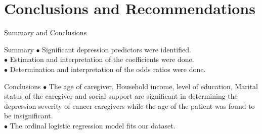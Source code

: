 \documentclass{beamer}
\numberwithin{equation}{section}
\numberwithin{table}{section}
\begin{document}
\section{Conclusions and Recommendations}
\begin{frame}{Summary and Conclusions}
	\begin{block}{Summary}
$\bullet$ Significant depression predictors were identified.\\
$\bullet$ Estimation and interpretation of the coefficients were done.\\
$\bullet$ Determination and interpretation of the odds ratios were done.
	\end{block}
\begin{block}{Conclusions}
$\bullet$ The age of caregiver, Household income, level of education, Marital status of the caregiver and social support are significant in determining the depression severity of cancer caregivers while the age of the patient was found to be insignificant.\\

$\bullet$ The ordinal logistic regression model fits our dataset.

\end{block}
\end{frame}
\end{document}
